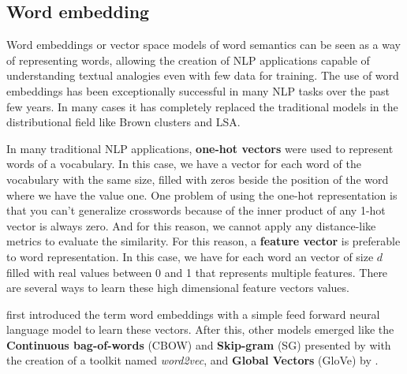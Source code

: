 \subsection{Word embedding}

Word embeddings or vector space models of word semantics can be seen as a way of representing words, allowing the creation of NLP applications capable of understanding textual analogies even with few data for training. The use of word embeddings has been exceptionally successful in many NLP tasks over the past few years. In many cases it has completely replaced the traditional models in the distributional field like Brown clusters and LSA.

In many traditional NLP applications, \textbf{one-hot vectors} were used to represent words of a vocabulary. In this case, we have a vector for each word of the vocabulary with the same size, filled with zeros beside the position of the word where we have the value one. 
One problem of using the one-hot representation is that you can't generalize crosswords because of the inner product of any 1-hot vector is always zero. And for this reason, we cannot apply any distance-like metrics to evaluate the similarity. For this reason, a \textbf{feature vector} is preferable to word representation. In this case, we have for each word an vector of size $d$ filled with real values between 0 and 1 that represents multiple features. There are several ways to learn these high dimensional feature vectors values. 

 first introduced the term word embeddings with a simple feed forward neural language model to learn these vectors. After this, other models emerged like the \textbf{Continuous bag-of-words} (CBOW) and \textbf{Skip-gram} (SG) presented by  with the creation of a toolkit named \textit{word2vec}, and \textbf{Global Vectors} (GloVe) by .




